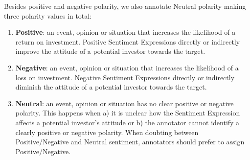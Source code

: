 Besides positive and negative polarity, we also annotate Neutral polarity making three polarity values in total:

\begin{enumerate}[label=\alph*), leftmargin=*] %
    \item \textbf{Positive}: an event, opinion or situation that increases the likelihood of a return on investment.
    Positive Sentiment Expressions directly or indirectly improve the attitude of a potential investor towards the target.
    \item \textbf{Negative}: an event, opinion or situation that increases the likelihood of a loss on investment.
    Negative Sentiment Expressions directly or indirectly diminish the attitude of a potential investor towards the target.
    \item \textbf{Neutral}: an event, opinion or situation has no clear positive or negative polarity.
    This happens when a) it is unclear how the Sentiment Expression affects a potential investor's attitude or b) the annotator cannot identify a clearly positive or negative polarity.
    When doubting between Positive/Negative and Neutral sentiment, annotators should prefer to assign Positive/Negative.
\end{enumerate}

